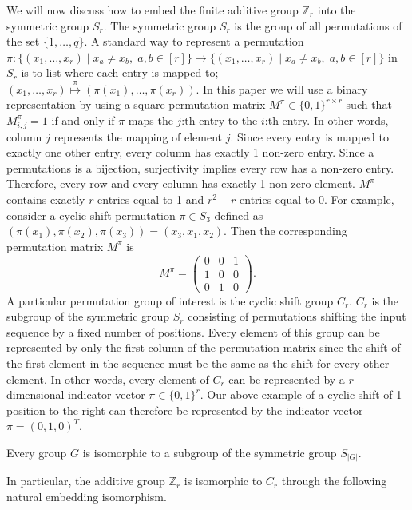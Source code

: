 We will now discuss how to embed the finite additive group $\mathbb{Z}_r$ into the symmetric group $S_r$. The symmetric group $S_r$ is the group of all permutations of the set $\{1, \dots, q\}$. A standard way to represent a permutation $\pi \colon \{(x_1, \dots, x_r) \mid x_a \neq x_b, \; a,b \in [r]\} \to \{(x_1, \dots, x_r) \mid x_a \neq x_b, \; a,b \in [r]\}$ in $S_r$ is to list where each entry is mapped to; $(x_1,\dots,x_r) \stackrel{\pi}{\mapsto} (\pi(x_1), \dots, \pi(x_r))$. In this paper we will use a binary representation by using a square permutation matrix $M^{\pi} \in \{0,1\}^{r \times r}$ such that $M^{\pi}_{i, j} = 1$ if and only if $\pi$ maps the $j$:th entry to the $i$:th entry. In other words, column $j$ represents the mapping of element $j$. Since every entry is mapped to exactly one other entry, every column has exactly 1 non-zero entry. Since a permutations is a bijection, surjectivity implies every row has a non-zero entry. Therefore, every row and every column has exactly 1 non-zero element. $M^{\pi}$ contains exactly $r$ entries equal to 1 and $r^2 - r$ entries equal to 0. For example, consider a cyclic shift permutation $\pi \in S_3$ defined as $(\pi(x_1),\pi(x_2),\pi(x_3))=(x_3,x_1,x_2)$. Then the corresponding permutation matrix $M^{\pi}$ is
\begin{equation*}
    M^{\pi} = \begin{pmatrix}
        0 & 0 & 1 \\
        1 & 0 & 0 \\
        0 & 1 & 0
    \end{pmatrix}.
\end{equation*}
A particular permutation group of interest is the cyclic shift group $C_r$. $C_r$ is the subgroup of the symmetric group $S_r$ consisting of permutations shifting the input sequence by a fixed number of positions. Every element of this group can be represented by only the first column of the permutation matrix since the shift of the first element in the sequence must be the same as the shift for every other element. In other words, every element of $C_r$ can be represented by a $r$ dimensional indicator vector $\pi \in \{0,1\}^r$. Our above example of a cyclic shift of 1 position to the right can therefore be represented by the indicator vector $\pi = (0,1,0)^T$.  
\begin{theorem}
    Every group $G$ is isomorphic to a subgroup of the symmetric group $S_{|G|}$.
\end{theorem}
In particular, the additive group $\mathbb{Z}_r$ is isomorphic to $C_r$ through the following natural embedding isomorphism.

